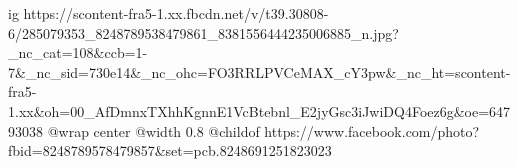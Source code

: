  
 
 
 
 

\ifcmt
  ig https://scontent-fra5-1.xx.fbcdn.net/v/t39.30808-6/285079353_8248789538479861_8381556444235006885_n.jpg?_nc_cat=108&ccb=1-7&_nc_sid=730e14&_nc_ohc=FO3RRLPVCeMAX_cY3pw&_nc_ht=scontent-fra5-1.xx&oh=00_AfDmnxTXhhKgnnE1VcBtebnl_E2jyGsc3iJwiDQ4Foez6g&oe=64793038
  @wrap center
  @width 0.8
  @childof https://www.facebook.com/photo?fbid=8248789578479857&set=pcb.8248691251823023
\fi
